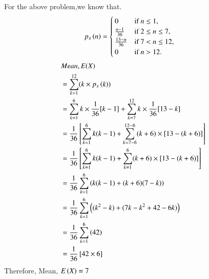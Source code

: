 \documentclass[journal,12pt,twocolumn]{IEEEtran}
\begin{document}
\begin{table}[hbt!]
\caption{Probability Distribution Table of X}
\label{table:1}
\end{table}
For the above problem,we know that.
\begin{align}
p_x\left(n\right) &= 
  \begin{cases}
    0 & \text{if } n \leq 1,\\
    \frac{n-1}{36} & \text{if } 2 \leq n \leq 7,\\
    \frac{13-n}{36} & \text{if } 7 < n \leq 12,\\
    0 & \text{if } n>12.
  \end{cases}
\end{align}
\begin{align}
    &Mean,E(X) \nonumber\\
    & =\sum_{k=1}^{12} (k \times p_x\left(k\right))\\
    & = \sum_{k=1}^{6}k\times\frac{1}{36}[k-1] + \sum_{k=7}^{12}k\times\frac{1}{36}[13-k]\\
    & = \frac{1}{36}\left[\sum_{k=1}^{6}k(k-1) + \sum_{k=7-6}^{12-6}(k+6)\times[13-(k+6)]\right]\\
    & = \frac{1}{36}\left[\sum_{k=1}^{6}k(k-1) + \sum_{k=1}^{6}(k+6)\times[13-(k+6)]\right]\\
    &= \frac{1}{36}\sum_{k=1}^{6}\left(k(k-1) + (k+6)(7-k)\right)\\
    &= \frac{1}{36}\sum_{k=1}^{6}\left((k^2- k)+ (7k-k^2+42-6k)\right)\\
    &= \frac{1}{36}\sum_{k=1}^{6}\left( 42\right)\\
    &= \frac{1}{36}\left[ 42 \times 6 \right]
\end{align}
Therefore,
 Mean, $E\left(X\right) = 7$
 
\end{document}

